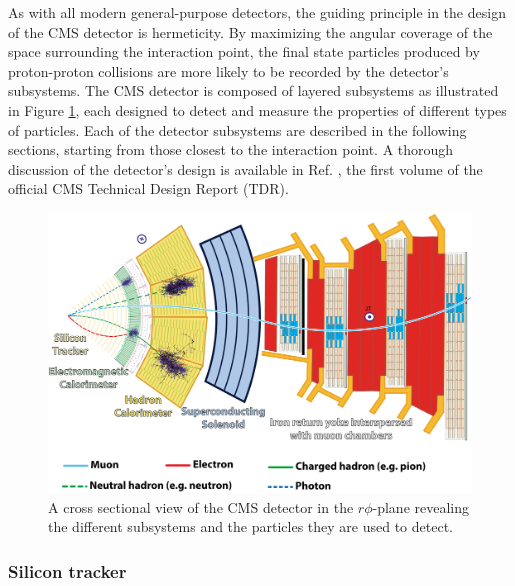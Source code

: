 As with all modern general-purpose detectors, the guiding principle in the design of the CMS detector is hermeticity. By maximizing the angular coverage of the space surrounding the interaction point, the final state particles produced by proton-proton collisions are more likely to be recorded by the detector's subsystems. The CMS detector is composed of layered subsystems as illustrated in Figure \ref{fig:CMSslice}, each designed to detect and measure the properties of different types of particles. Each of the detector subsystems are described in the following sections, starting from those closest to the interaction point. A thorough discussion of the detector's design is available in Ref. \cite{CMSTDR1}, the first volume of the official CMS Technical Design Report (TDR).

\begin{figure}[htbp]
  \centering
    \includegraphics[width=5.5in]{images/CMSslice_whiteBackground}
    \caption[Cross Sectional View of the CMS Detector]{A cross sectional view of the CMS detector in the $r\phi$-plane revealing the different subsystems and the particles they are used to detect.\cite{CMSslice}}
    \label{fig:CMSslice}
\end{figure}

\subsubsection{Silicon tracker}

